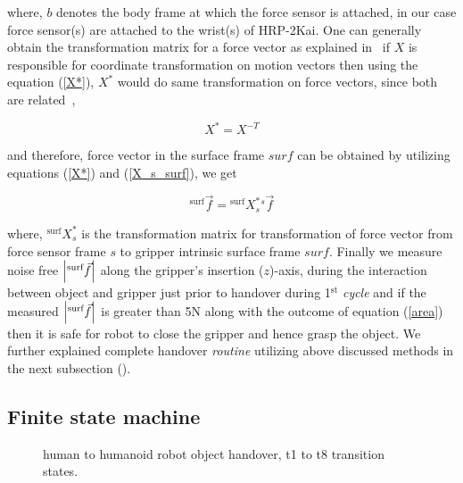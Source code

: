 where, $b$ denotes the body frame at which the force sensor is attached, in our case force sensor(s) are attached to the wrist(s) of HRP-2Kai. One can generally obtain the transformation matrix for a force vector as explained in~\cite{featherstone2014rigid} if $X$ is responsible for coordinate transformation on motion vectors then using the equation (\ref{X*}), $X^{*}$ would do same transformation on force vectors, since both are related~\cite{featherstone2014rigid},

\begin{equation}\label{X*}
    X^{*} = X^{-T}
\end{equation}

and therefore, force vector in the surface frame $surf$ can be obtained by utilizing equations (\ref{X*}) and (\ref{X_s_surf}), we get

\begin{equation}\label{force surf}
    {}^\text{surf}\vec{f} = {}^\text{surf}X_{s}^{*} {}^s\vec{f}
\end{equation}

where, ${}^\text{surf}X_{s}^{*}$ is the transformation matrix for transformation of force vector from force sensor frame $s$ to gripper intrinsic surface frame $surf$. Finally we measure noise free $\abs{{}^\text{surf}\vec{f}}$ along the gripper's insertion ($z$)-axis, during the interaction between object and gripper just prior to handover during 1$^\text{st}$ \textit{cycle} and if the measured $\abs{{}^\text{surf}\vec{f}}$ is greater than 5N along with the outcome of equation (\ref{area}) then it is safe for robot to close the gripper and hence grasp the object. We further explained complete handover \textit{routine} utilizing above discussed methods in the next subsection ().

\subsection{Finite state machine}\label{FSM}

\begin{figure}[hpt]
	\caption{human to humanoid robot object handover, t1 to t8 transition states.}
	\label{fig:h-to-r}
\end{figure}

